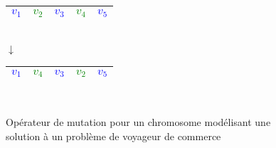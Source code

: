 \begin{figure}[h]
\centering
\tiny  
   \begin{tabular}{|c|c|c|c|c|}
	  \hline
	  \textcolor{blue}{$v_1$} & \textcolor{green}{$v_2$} & \textcolor{blue}{$v_3$} & \textcolor{green}{$v_4$}	& \textcolor{blue}{$v_5$}\\
	  \hline
  \end{tabular}\\
  $\downarrow$\\
  \begin{tabular}{|c|c|c|c|c|}
	  \hline
	  \textcolor{blue}{$v_1$} & \textcolor{green}{$v_4$} & \textcolor{blue}{$v_3$} & \textcolor{green}{$v_2$}	& \textcolor{blue}{$v_5$}\\
	  \hline
  \end{tabular}\\
  \caption{Opérateur de mutation pour un chromosome modélisant une solution à un problème de voyageur de commerce}
  \label{fig:mutationTSP}
\end{figure}

